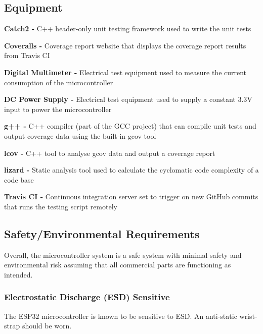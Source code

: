 \documentclass[12pt]{article}
\begin{document}
\subsection{Equipment}
    \begin{equiplist}
        \item \textbf{Catch2 -} C++ header-only unit testing framework used to write the unit tests
        \item \textbf{Coveralls -} Coverage report website that displays the coverage report results from Travis CI
        \item \textbf{Digital Multimeter -} Electrical test equipment used to measure the current consumption of the microcontroller
        \item \textbf{DC Power Supply -} Electrical test equipment used to supply a constant 3.3V input to power the microcontroller
        \item \textbf{g++ -} C++ compiler (part of the GCC project) that can compile unit tests and output coverage data using the built-in gcov tool
        \item \textbf{lcov -} C++ tool to analyse gcov data and output a coverage report
        \item \textbf{lizard -} Static analysis tool used to calculate the cyclomatic code complexity of a code base
        \item \textbf{Travis CI -} Continuous integration server set to trigger on new GitHub commits that runs the testing script remotely
    \end{equiplist}

\subsection{Safety/Environmental Requirements}
Overall, the microcontroller system is a safe system with minimal safety and environmental risk assuming that all commercial parts are functioning as intended.

\subsubsection{Electrostatic Discharge (ESD) Sensitive}
The ESP32 microcontroller is known to be sensitive to ESD. An anti-static wrist-strap should be worn.
\end{document}
